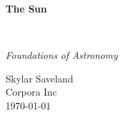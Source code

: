 \clearpage
\vspace*{1.5in}
\begin{center}
  \begin{minipage}{\textwidth}
    \centering
    \Huge\bfseries
    \linespread{1.25}\selectfont
  The Sun
  \end{minipage}
  \\[3em]
  {\Large\itshape\linespread{1.3}\selectfont
  Foundations of Astronomy\par}
  \vfill
  {\large Skylar Saveland}
  \\[1em]
  {\large Corpora Inc}
  \\[1em]
  {\large \today}
\end{center}
\clearpage

